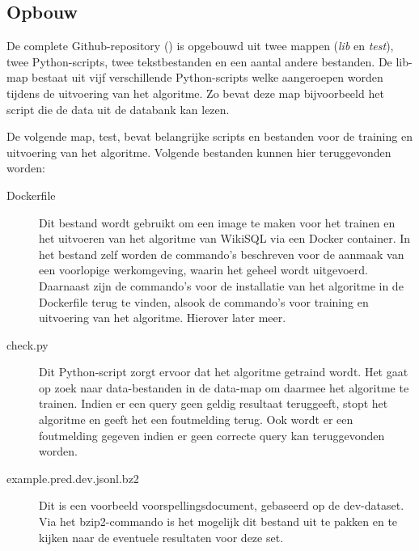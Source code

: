\subsection{Opbouw}

De complete Github-repository (\textcite{wikisql}) is opgebouwd uit twee mappen (\textit{lib} en \textit{test}), twee Python-scripts, twee tekstbestanden en een aantal andere bestanden. De lib-map bestaat uit vijf verschillende Python-scripts welke aangeroepen worden tijdens de uitvoering van het algoritme. Zo bevat deze map bijvoorbeeld het script die de data uit de databank kan lezen. 

De volgende map, test, bevat belangrijke scripts en bestanden voor de training en uitvoering van het algoritme. Volgende bestanden kunnen hier teruggevonden worden:
\begin{description}
	\item[Dockerfile] Dit bestand wordt gebruikt om een image te maken voor het trainen en het uitvoeren van het algoritme van WikiSQL via een Docker container. In het bestand zelf worden de commando's beschreven voor de aanmaak van een voorlopige werkomgeving, waarin het geheel wordt uitgevoerd. Daarnaast zijn de commando's voor de installatie van het algoritme in de Dockerfile terug te vinden, alsook de commando's voor training en uitvoering van het algoritme. Hierover later meer.
	\item[check.py] Dit Python-script zorgt ervoor dat het algoritme getraind wordt. Het gaat op zoek naar data-bestanden in de data-map om daarmee het algoritme te trainen. Indien er een query geen geldig resultaat teruggeeft, stopt het algoritme en geeft het een foutmelding terug. Ook wordt er een foutmelding gegeven indien er geen correcte query kan teruggevonden worden.
	\item[example.pred.dev.jsonl.bz2] Dit is een voorbeeld voorspellingsdocument, gebaseerd op de dev-dataset. Via het bzip2-commando is het mogelijk dit bestand uit te pakken en te kijken naar de eventuele resultaten voor deze set.
\end{description}

